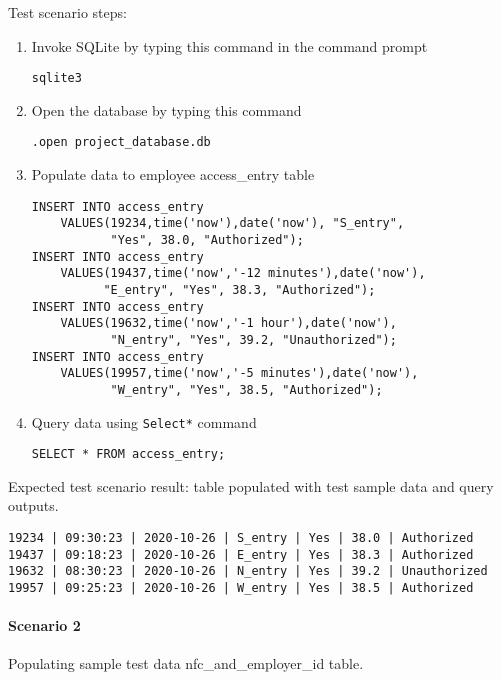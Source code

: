 \noindent
Test scenario steps:
\begin{enumerate}
    \item Invoke SQLite by typing this command in the command prompt
\begin{lstlisting}
sqlite3
\end{lstlisting}
    \item Open the database by typing this command 
\begin{listing}[H]
\begin{verbatim}
.open project_database.db
\end{verbatim}
\end{listing}
    \item Populate data to employee access\_entry table
\begin{listing}[H]
\begin{verbatim}
INSERT INTO access_entry
    VALUES(19234,time('now'),date('now'), "S_entry",
           "Yes", 38.0, "Authorized");
INSERT INTO access_entry
    VALUES(19437,time('now','-12 minutes'),date('now'),
          "E_entry", "Yes", 38.3, "Authorized");
INSERT INTO access_entry
    VALUES(19632,time('now','-1 hour'),date('now'),
           "N_entry", "Yes", 39.2, "Unauthorized");
INSERT INTO access_entry
    VALUES(19957,time('now','-5 minutes'),date('now'),
           "W_entry", "Yes", 38.5, "Authorized");
\end{verbatim}
\end{listing}
    \item Query data using \lstinline{Select*} command
\begin{listing}[H]
\begin{verbatim}
SELECT * FROM access_entry;
\end{verbatim}
\end{listing}
\end{enumerate}

\noindent
Expected test scenario result: table populated with test sample data and query
outputs.

\begin{lstlisting}
19234 | 09:30:23 | 2020-10-26 | S_entry | Yes | 38.0 | Authorized
19437 | 09:18:23 | 2020-10-26 | E_entry | Yes | 38.3 | Authorized
19632 | 08:30:23 | 2020-10-26 | N_entry | Yes | 39.2 | Unauthorized
19957 | 09:25:23 | 2020-10-26 | W_entry | Yes | 38.5 | Authorized
\end{lstlisting}

\paragraph{Scenario 2}
Populating sample test data nfc\_and\_employer\_id table.

